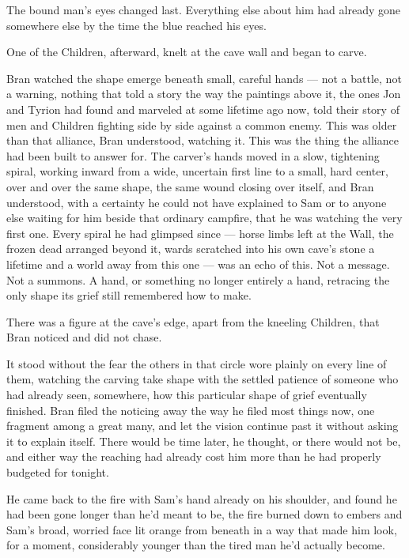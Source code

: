 The bound man’s eyes changed last. Everything else about him had already gone somewhere else by the time the blue reached his eyes.

\sceneBreak

One of the Children, afterward, knelt at the cave wall and began to carve.

Bran watched the shape emerge beneath small, careful hands — not a battle, not a warning, nothing that told a story the way the paintings above it, the ones Jon and Tyrion had found and marveled at some lifetime ago now, told their story of men and Children fighting side by side against a common enemy. This was older than that alliance, Bran understood, watching it. This was the thing the alliance had been built to answer for. The carver’s hands moved in a slow, tightening spiral, working inward from a wide, uncertain first line to a small, hard center, over and over the same shape, the same wound closing over itself, and Bran understood, with a certainty he could not have explained to Sam or to anyone else waiting for him beside that ordinary campfire, that he was watching the very first one. Every spiral he had glimpsed since — horse limbs left at the Wall, the frozen dead arranged beyond it, wards scratched into his own cave’s stone a lifetime and a world away from this one — was an echo of this. Not a message. Not a summons. A hand, or something no longer entirely a hand, retracing the only shape its grief still remembered how to make.

There was a figure at the cave’s edge, apart from the kneeling Children, that Bran noticed and did not chase.

It stood without the fear the others in that circle wore plainly on every line of them, watching the carving take shape with the settled patience of someone who had already seen, somewhere, how this particular shape of grief eventually finished. Bran filed the noticing away the way he filed most things now, one fragment among a great many, and let the vision continue past it without asking it to explain itself. There would be time later, he thought, or there would not be, and either way the reaching had already cost him more than he had properly budgeted for tonight.

\sceneBreak

He came back to the fire with Sam’s hand already on his shoulder, and found he had been gone longer than he’d meant to be, the fire burned down to embers and Sam’s broad, worried face lit orange from beneath in a way that made him look, for a moment, considerably younger than the tired man he’d actually become.

